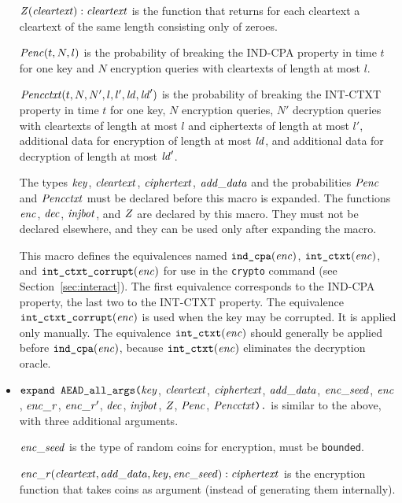 \documentclass{article}
\begin{document}
\begin{itemize}
   $\mathit{Z}(\mathit{cleartext}): \mathit{cleartext}$ is the function that
  returns for each cleartext a cleartext of the same length consisting
  only of zeroes.

  $\mathit{Penc}(t, N, l)$ is the probability of breaking the IND-CPA
  property in time $t$ for one key and $N$ encryption queries with
  cleartexts of length at most $l$.

  $\mathit{Pencctxt}(t, N, N', l, l', \mathit{ld}, \mathit{ld}')$ is the probability of
  breaking the INT-CTXT property in time $t$ for one key, $N$
  encryption queries, $N'$ decryption queries with cleartexts of
  length at most $l$ and ciphertexts of length at most $l'$,
  additional data for encryption of length at most $\mathit{ld}$, and
  additional data for decryption of length at most $\mathit{ld}'$.

   The types $\mathit{key}$, $\mathit{cleartext}$,
   $\mathit{ciphertext}$, $\mathit{add\_data}$ and the probabilities $\mathit{Penc}$ and $\mathit{Pencctxt}$ must
   be declared before this macro is expanded. The functions
   $\mathit{enc}$, $\mathit{dec}$, $\mathit{injbot}$, and $\mathit{Z}$ are declared by this
   macro. They must not be declared elsewhere, and they can be used
   only after expanding the macro.

   This macro defines the equivalences named $\texttt{ind\_cpa}(\mathit{enc})$,
   $\texttt{int\_ctxt}(\mathit{enc})$, and $\texttt{int\_ctxt\_corrupt}(\mathit{enc})$ 
   for use in the \texttt{crypto} command 
   (see Section~\ref{sec:interact}). 
   The first equivalence corresponds to the
   IND-CPA property, the last two to the INT-CTXT property.
   The equivalence $\texttt{int\_ctxt\_corrupt}(\mathit{enc})$ is used when the
   key may be corrupted. It is applied only manually.
   The equivalence $\texttt{int\_ctxt}(\mathit{enc})$
   should generally be applied before $\texttt{ind\_cpa}(\mathit{enc})$,
   because $\texttt{int\_ctxt}(\mathit{enc})$ eliminates the decryption oracle.

\item $\texttt{expand AEAD\_all\_args(}\mathit{key}$,
$  \mathit{cleartext}$, $\mathit{ciphertext}$, $\mathit{add\_data}$, $\mathit{enc\_seed}$, $\mathit{enc}$, $\mathit{enc\_r}$, $\mathit{enc\_r}'$,
$  \mathit{dec}$, $\mathit{injbot}$, $\mathit{Z}$, $\mathit{Penc}$, $\mathit{Pencctxt}\texttt{).}$ is similar to the above,
  with three additional arguments. 

  $\mathit{enc\_seed}$ is the type of random coins for encryption, must be \texttt{bounded}.

  $\mathit{enc\_r}(\mathit{cleartext}, \mathit{add\_data}, \mathit{key}, \mathit{enc\_seed}): \mathit{ciphertext}$ is the encryption function that takes coins as argument (instead of generating them internally).


\end{itemize}
\end{document}
